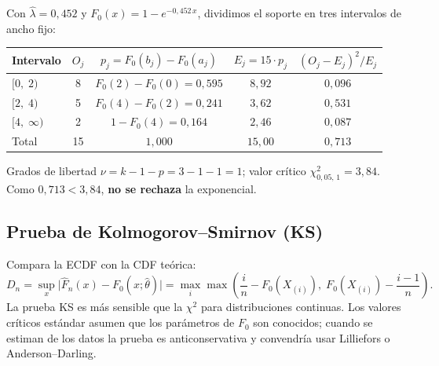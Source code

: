 \documentclass[11pt, letterpaper]{article}
\begin{document}
\begin{ejemplobox}
Con $\hat\lambda = 0{,}452$ y $F_0(x)=1-e^{-0{,}452\,x}$, dividimos el soporte en tres intervalos de ancho fijo:

\begin{center}\small
\renewcommand{\arraystretch}{1.25}
\begin{tabular}{lcccc}
\toprule
\textbf{Intervalo} & $O_j$ & $p_j = F_0(b_j)-F_0(a_j)$ & $E_j = 15\cdot p_j$ & $(O_j-E_j)^2/E_j$ \\
\midrule
$[0,\;2)$      & 8 & $F_0(2)-F_0(0) = 0{,}595$ & $8{,}92$ & $0{,}096$ \\
$[2,\;4)$      & 5 & $F_0(4)-F_0(2) = 0{,}241$ & $3{,}62$ & $0{,}531$ \\
$[4,\;\infty)$ & 2 & $1-F_0(4) = 0{,}164$      & $2{,}46$ & $0{,}087$ \\
\midrule
Total          & 15 & $1{,}000$ & $15{,}00$ & $\boxed{0{,}713}$ \\
\bottomrule
\end{tabular}
\end{center}

Grados de libertad $\nu = k - 1 - p = 3-1-1 = 1$; valor crítico $\chi^2_{0{,}05,\,1} = 3{,}84$.
Como $0{,}713 < 3{,}84$, \textbf{no se rechaza} la exponencial.
\end{ejemplobox}

\subsection{Prueba de Kolmogorov--Smirnov (KS)}

Compara la ECDF con la CDF teórica:
\[
D_n = \sup_x\bigl|\hat{F}_n(x) - F_0(x;\hat\theta)\bigr| = \max_i\max\!\left(\frac{i}{n}-F_0(X_{(i)}),\;F_0(X_{(i)})-\frac{i-1}{n}\right).
\]
La prueba KS es más sensible que la $\chi^2$ para distribuciones continuas. Los valores críticos estándar asumen que los parámetros de $F_0$ son conocidos; cuando se estiman de los datos la prueba es anticonservativa y convendría usar Lilliefors o Anderson--Darling.
\end{document}
